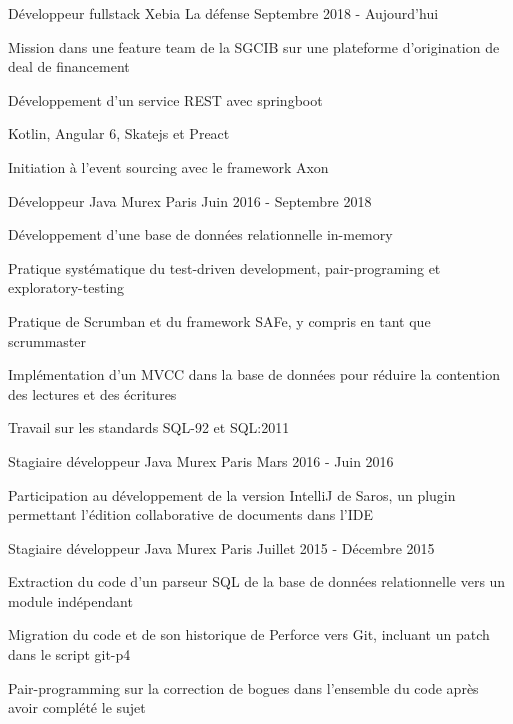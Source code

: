 
\begin{cventries}

\cventry
{Développeur fullstack}
{Xebia}
{La défense}
{Septembre 2018 - Aujourd'hui}
{
	\begin{cvitems}
	\item{Mission dans une feature team de la SGCIB sur une plateforme d'origination de deal de financement}
	\item{Développement d'un service REST avec springboot}
	\item{Kotlin, Angular 6, Skatejs et Preact}
	\item{Initiation à l'event sourcing avec le framework Axon}
	\end{cvitems}
}

\cventry
{Développeur Java}
{Murex}
{Paris}
{Juin 2016 - Septembre 2018}
{
	\begin{cvitems}
	\item{Développement d'une base de données relationnelle in-memory}
	\item{Pratique systématique du test-driven development, pair-programing et exploratory-testing}
	\item{Pratique de Scrumban et du framework SAFe, y compris en tant que scrummaster}
	\item{Implémentation d'un MVCC dans la base de données pour réduire la contention des lectures et des écritures}
	\item{Travail sur les standards SQL-92 et SQL:2011}
	\end{cvitems}
}

\cventry
{Stagiaire développeur Java}
{Murex}
{Paris}
{Mars 2016 - Juin 2016}
{
	\begin{cvitems}
	\item{Participation au développement de la version IntelliJ de Saros, un plugin permettant l'édition collaborative de documents dans l'IDE}
	\end{cvitems}
}

\cventry
{Stagiaire développeur Java}
{Murex}
{Paris}
{Juillet 2015 - Décembre 2015}
{
	\begin{cvitems}
	\item{Extraction du code d'un parseur SQL de la base de données relationnelle vers un module indépendant}
	\item{Migration du code et de son historique de Perforce vers Git, incluant un patch dans le script git-p4}
	\item{Pair-programming sur la correction de bogues dans l'ensemble du code après avoir complété le sujet}
	\end{cvitems}
}


\end{cventries}
